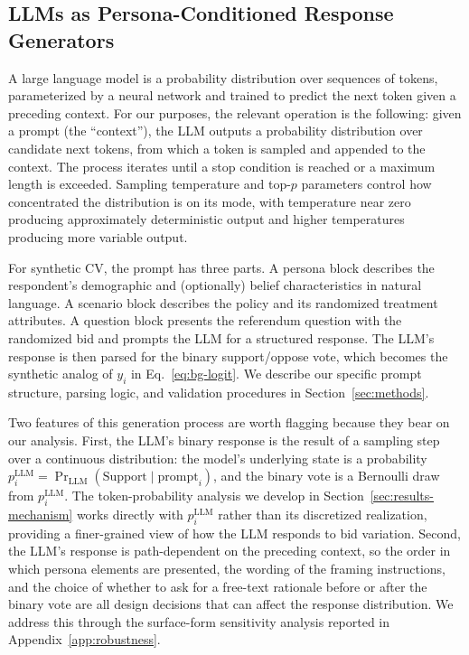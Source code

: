 \documentclass[12pt]{article}
\begin{document}
\subsection{LLMs as Persona-Conditioned Response Generators}\label{sec:bg-llms}

A large language model is a probability distribution over sequences of tokens, parameterized by a neural network and trained to predict the next token given a preceding context. For our purposes, the relevant operation is the following: given a prompt (the ``context''), the LLM outputs a probability distribution over candidate next tokens, from which a token is sampled and appended to the context. The process iterates until a stop condition is reached or a maximum length is exceeded. Sampling temperature and top-$p$ parameters control how concentrated the distribution is on its mode, with temperature near zero producing approximately deterministic output and higher temperatures producing more variable output.

For synthetic CV, the prompt has three parts. A persona block describes the respondent's demographic and (optionally) belief characteristics in natural language. A scenario block describes the policy and its randomized treatment attributes. A question block presents the referendum question with the randomized bid and prompts the LLM for a structured response. The LLM's response is then parsed for the binary support/oppose vote, which becomes the synthetic analog of $y_i$ in Eq.~\ref{eq:bg-logit}. We describe our specific prompt structure, parsing logic, and validation procedures in Section~\ref{sec:methods}.

Two features of this generation process are worth flagging because they bear on our analysis. First, the LLM's binary response is the result of a sampling step over a continuous distribution: the model's underlying state is a probability $p_i^{\text{LLM}} = \Pr_{\text{LLM}}(\text{Support} \mid \text{prompt}_i)$, and the binary vote is a Bernoulli draw from $p_i^{\text{LLM}}$. The token-probability analysis we develop in Section~\ref{sec:results-mechanism} works directly with $p_i^{\text{LLM}}$ rather than its discretized realization, providing a finer-grained view of how the LLM responds to bid variation. Second, the LLM's response is path-dependent on the preceding context, so the order in which persona elements are presented, the wording of the framing instructions, and the choice of whether to ask for a free-text rationale before or after the binary vote are all design decisions that can affect the response distribution. We address this through the surface-form sensitivity analysis reported in Appendix~\ref{app:robustness}.
\end{document}
